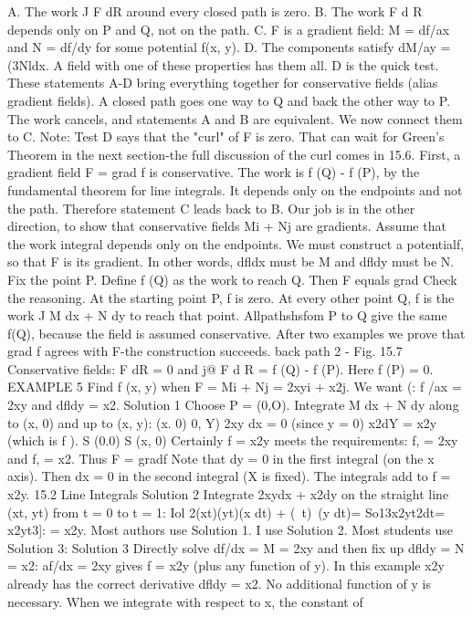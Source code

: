 A. The work J F dR around every closed path is zero.
B. The work F d R depends only on P and Q, not on the path.
C. F is a gradient field: M = df/ax and N = df/dy for some potential f(x, y).
D. The components satisfy dM/ay = (3Nldx.
A field with one of these properties has them all. D is the quick test.
These statements A-D bring everything together for conservative fields (alias gradient
fields). A closed path goes one way to Q and back the other way to P. The work
cancels, and statements A and B are equivalent. We now connect them to C. Note:
Test D says that the "curl" of F is zero. That can wait for Green's Theorem in the
next section-the full discussion of the curl comes in 15.6.
First, a gradient field F = grad f is conservative. The work is f (Q) - f (P), by the
fundamental theorem for line integrals. It depends only on the endpoints and not the
path. Therefore statement C leads back to B.
Our job is in the other direction, to show that conservative fields Mi + Nj are
gradients. Assume that the work integral depends only on the endpoints. We must
construct a potentialf, so that F is its gradient. In other words, dfldx must be M and
dfldy must be N.
Fix the point P. Define f (Q) as the work to reach Q. Then F equals grad
Check the reasoning. At the starting point P, f is zero. At every other point Q, f is
the work J M dx + N dy to reach that point. Allpathshsfom P to Q give the same f(Q),
because the field is assumed conservative. After two examples we prove that grad f
agrees with F-the construction succeeds.
back path 2 -
Fig. 15.7 Conservative fields:  F dR = 0 and j@ F d R = f (Q) - f (P). Here f (P) = 0.
EXAMPLE 5 Find f (x, y) when F = Mi + Nj = 2xyi + x2j. We want (: f /ax = 2xy
and dfldy = x2.
Solution 1 Choose P = (0,O). Integrate M dx + N dy along to (x, 0) and up to (x, y):
(x. 0) 0, Y)
2xy dx = 0 (since y = 0) x2dY = x2y (which is f ). S (0.0) S (x, 0)
Certainly f = x2y meets the requirements: f, = 2xy and f, = x2. Thus F = gradf Note
that dy = 0 in the first integral (on the x axis). Then dx = 0 in the second integral
(X is fixed). The integrals add to f = x2y. 
15.2 Line Integrals
Solution 2 Integrate 2xydx + x2dy on the straight line (xt, yt) from t = 0 to t = 1:
Iol 2(xt)(yt)(x dt) + (~t)~(y dt)= So13x2yt2dt= x2yt3]: = x2y.
Most authors use Solution 1. I use Solution 2. Most students use Solution 3:
Solution 3 Directly solve df/dx = M = 2xy and then fix up dfldy = N = x2:
af/dx = 2xy gives f = x2y (plus any function of y).
In this example x2y already has the correct derivative dfldy = x2. No additional
function of y is necessary. When we integrate with respect to x, the constant of
